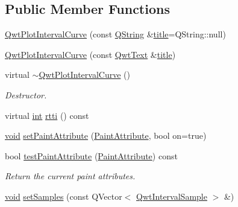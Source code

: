 \subsection*{Public Member Functions}
\begin{DoxyCompactItemize}
\item 
\hyperlink{class_qwt_plot_interval_curve_af5bfe837aec8dc8884394ca7813a8d41}{Qwt\-Plot\-Interval\-Curve} (const \hyperlink{group___u_a_v_objects_plugin_gab9d252f49c333c94a72f97ce3105a32d}{Q\-String} \&\hyperlink{class_qwt_plot_item_a3859d011b670b5f89e45d1ccef9206f7}{title}=Q\-String\-::null)
\item 
\hyperlink{class_qwt_plot_interval_curve_ab7d0884ffb900fc453d621580f348c0e}{Qwt\-Plot\-Interval\-Curve} (const \hyperlink{class_qwt_text}{Qwt\-Text} \&\hyperlink{class_qwt_plot_item_a3859d011b670b5f89e45d1ccef9206f7}{title})
\item 
virtual \hyperlink{class_qwt_plot_interval_curve_a1b04a9a4e327b8e33de2c02cf89fa574}{$\sim$\-Qwt\-Plot\-Interval\-Curve} ()
\begin{DoxyCompactList}\small\item\em Destructor. \end{DoxyCompactList}\item 
virtual \hyperlink{ioapi_8h_a787fa3cf048117ba7123753c1e74fcd6}{int} \hyperlink{class_qwt_plot_interval_curve_a59e7b26fc91dd3c7c2412b5fd8d4ca9f}{rtti} () const 
\item 
\hyperlink{group___u_a_v_objects_plugin_ga444cf2ff3f0ecbe028adce838d373f5c}{void} \hyperlink{class_qwt_plot_interval_curve_ab962c4ad6896bc9d9450f6436f00bd81}{set\-Paint\-Attribute} (\hyperlink{class_qwt_plot_interval_curve_a3deaf543802d69a38961f9e944bfad95}{Paint\-Attribute}, bool on=true)
\item 
bool \hyperlink{class_qwt_plot_interval_curve_ac8a923fcf205493466e1e086eecec8b7}{test\-Paint\-Attribute} (\hyperlink{class_qwt_plot_interval_curve_a3deaf543802d69a38961f9e944bfad95}{Paint\-Attribute}) const 
\begin{DoxyCompactList}\small\item\em Return the current paint attributes. \end{DoxyCompactList}\item 
\hyperlink{group___u_a_v_objects_plugin_ga444cf2ff3f0ecbe028adce838d373f5c}{void} \hyperlink{class_qwt_plot_interval_curve_ac60fd04f3000b26ea82342065ba82afe}{set\-Samples} (const Q\-Vector$<$ \hyperlink{class_qwt_interval_sample}{Qwt\-Interval\-Sample} $>$ \&)
\item 

\end{DoxyCompactItemize}

